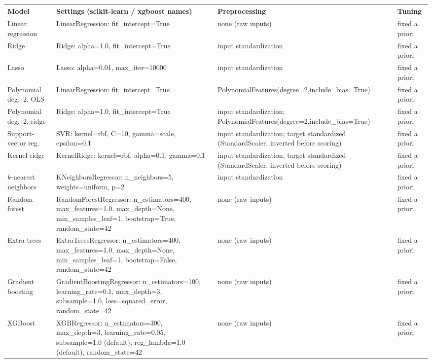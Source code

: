 \footnotesize\setlength{\tabcolsep}{2.5pt}%
\begin{tabular}{@{}>{\raggedright\arraybackslash}p{}>{\raggedright\arraybackslash}p{}>{\raggedright\arraybackslash}p{}>{\raggedright\arraybackslash}p{}@{}}
\toprule
Model & Settings (scikit-learn / xgboost names) & Preprocessing & Tuning \\
\midrule
Linear regression & LinearRegression: fit\_intercept=True & none (\allowbreak raw inputs) & fixed a priori \\
Ridge & Ridge: alpha=1.0, fit\_intercept=True & input standardization & fixed a priori \\
Lasso & Lasso: alpha=0.01, max\_iter=10000 & input standardization & fixed a priori \\
Polynomial deg.\ 2, OLS & LinearRegression: fit\_intercept=True & PolynomialFeatures(\allowbreak degree=2,\allowbreak include\_bias=True) & fixed a priori \\
Polynomial deg.\ 2, ridge & Ridge: alpha=1.0, fit\_intercept=True & input standardization; PolynomialFeatures(\allowbreak degree=2,\allowbreak include\_bias=True) & fixed a priori \\
Support-vector reg. & SVR: kernel=rbf, C=10, gamma=scale, epsilon=0.1 & input standardization; target standardized (StandardScaler, inverted before scoring) & fixed a priori \\
Kernel ridge & KernelRidge: kernel=rbf, alpha=0.1, gamma=0.1 & input standardization; target standardized (StandardScaler, inverted before scoring) & fixed a priori \\
$k$-nearest neighbors & KNeighborsRegressor: n\_neighbors=5, weights=uniform, p=2 & input standardization & fixed a priori \\
Random forest & RandomForestRegressor: n\_estimators=400, max\_features=1.0, max\_depth=None, min\_samples\_leaf=1, bootstrap=True, random\_state=42 & none (\allowbreak raw inputs) & fixed a priori \\
Extra-trees & ExtraTreesRegressor: n\_estimators=400, max\_features=1.0, max\_depth=None, min\_samples\_leaf=1, bootstrap=False, random\_state=42 & none (\allowbreak raw inputs) & fixed a priori \\
Gradient boosting & GradientBoostingRegressor: n\_estimators=100, learning\_rate=0.1, max\_depth=3, subsample=1.0, loss=squared\_error, random\_state=42 & none (\allowbreak raw inputs) & fixed a priori \\
XGBoost & XGBRegressor: n\_estimators=300, max\_depth=3, learning\_rate=0.05, subsample=1.0 (default), reg\_lambda=1.0 (default), random\_state=42 & none (\allowbreak raw inputs) & fixed a priori \\

\end{tabular}
